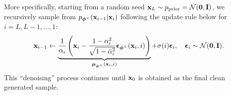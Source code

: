 More specifically, starting from a random seed ${\mathbf{x}}_L \sim p_{\text{prior}} = \mathcal{N}(\bm{0},{\mathbf{I}})$, we recursively sample from $p_{\bm{\phi}^\times}({\mathbf{x}}_{i-1} | {\mathbf{x}}_i)$ following the update rule below for $i = L, L-1, \dots, 1$:
\begin{align}\label{eq:ddpm-sampling}
    {\mathbf{x}}_{i-1} \leftarrow \underbrace{\frac{1}{\alpha_i}\left( {\mathbf{x}}_i  - \frac{1-\alpha_i^2}{\sqrt{1-\bar{\alpha}_i^2}} \bm{\epsilon}_{\bm{\phi}^\times}({\mathbf{x}}_i, i)\right)}_{\bm{\mu}_{\bm{\phi}^\times}({\mathbf{x}}_i, i)} +\sigma(i) \bm{\epsilon}_i,\quad \bm{\epsilon}_i\sim  \mathcal{N}(\bm{0},{\mathbf{I}}).
\end{align}
This ``denoising'' process continues until ${\mathbf{x}}_0$ is obtained as the final clean generated sample. 





